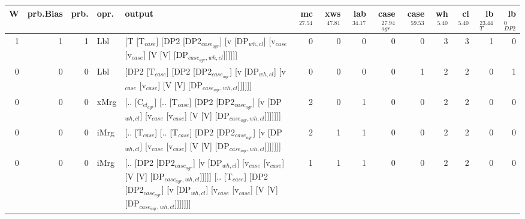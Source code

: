 \begin{tabularx}{\linewidth}{rrrlXrrrrrrrrr}
\hline
   W &   prb.Bias &   prb. & opr.   & output                                                                                                                                                                                 &   mc$^{27.54}$ &   xws$^{47.81}$ &   lab$^{34.17}$ &   case$_{agr}^{27.94}$ &   case$^{59.53}$ &   wh$^{5.40}$ &   cl$^{5.40}$ &   lb$_{T}^{23.44}$ &   lb$_{DP2}^{0}$ \\
\hline
   1 &       1 &   1 & Lbl  & [T [T$_{case}$] [DP2 [DP2$_{case_{agr}}$] [v [DP$_{wh,cl}$] [v$_{case}$ [v$_{case}$] [V [V] [DP$_{case_{agr},wh,cl}$]]]]]]                                                                                         &            0 &             0 &             0 &                  0 &              0 &           3 &           3 &              1 &            0 \\
   0 &       0 &   0 & Lbl  & [DP2 [T$_{case}$] [DP2 [DP2$_{case_{agr}}$] [v [DP$_{wh,cl}$] [v$_{case}$ [v$_{case}$] [V [V] [DP$_{case_{agr},wh,cl}$]]]]]]                                                                                       &            0 &             0 &             0 &                  0 &              1 &           2 &           2 &              0 &            1 \\
   0 &       0 &   0 & xMrg & [.. [C$_{cl_{agr}}$] [.. [T$_{case}$] [DP2 [DP2$_{case_{agr}}$] [v [DP$_{wh,cl}$] [v$_{case}$ [v$_{case}$] [V [V] [DP$_{case_{agr},wh,cl}$]]]]]]]                                                                        &            2 &             0 &             1 &                  0 &              0 &           2 &           2 &              0 &            0 \\
   0 &       0 &   0 & iMrg & [.. [T$_{case}$] [.. [T$_{case}$] [DP2 [DP2$_{case_{agr}}$] [v [DP$_{wh,cl}$] [v$_{case}$ [v$_{case}$] [V [V] [DP$_{case_{agr},wh,cl}$]]]]]]]                                                                          &            2 &             1 &             1 &                  0 &              0 &           2 &           2 &              0 &            0 \\
   0 &       0 &   0 & iMrg & [.. [DP2 [DP2$_{case_{agr}}$] [v [DP$_{wh,cl}$] [v$_{case}$ [v$_{case}$] [V [V] [DP$_{case_{agr},wh,cl}$]]]]] [.. [T$_{case}$] [DP2 [DP2$_{case_{agr}}$] [v [DP$_{wh,cl}$] [v$_{case}$ [v$_{case}$] [V [V] [DP$_{case_{agr},wh,cl}$]]]]]]] &            1 &             1 &             1 &                  0 &              0 &           2 &           2 &              0 &            0 \\

\end{tabularx}
